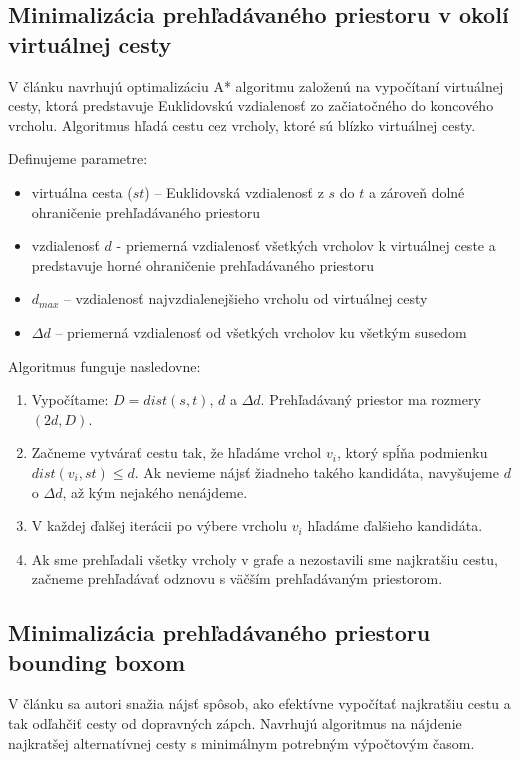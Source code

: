 \subsection{Minimalizácia prehľadávaného priestoru v okolí virtuálnej cesty}

V článku \cite{timedependent} navrhujú optimalizáciu A* algoritmu založenú na vypočítaní virtuálnej cesty, ktorá predstavuje Euklidovskú vzdialenosť zo začiatočného do koncového vrcholu. Algoritmus hľadá cestu cez vrcholy, ktoré sú blízko virtuálnej cesty. 

Definujeme parametre:
\begin{itemize}
\item{virtuálna cesta ($st$) – Euklidovská vzdialenosť z $s$ do $t$} a zároveň dolné ohraničenie prehľadávaného priestoru
\item{vzdialenosť $d$ - priemerná vzdialenosť všetkých vrcholov k virtuálnej ceste a predstavuje horné ohraničenie prehľadávaného priestoru}
\item{$d_{max}$ – vzdialenosť najvzdialenejšieho vrcholu od virtuálnej cesty}
\item{$\Delta d$ – priemerná vzdialenosť od všetkých vrcholov ku všetkým susedom}
\end{itemize}

Algoritmus funguje nasledovne:
\begin{enumerate}
\item Vypočítame: $D = dist(s,t)$, $d$ a $\Delta d$. Prehľadávaný priestor ma rozmery $(2d,D)$.
\item Začneme vytvárať cestu tak, že hľadáme vrchol $v_i$, ktorý spĺňa podmienku \\$dist(v_i, st) \leq d$. Ak nevieme nájsť žiadneho takého kandidáta, navyšujeme $d$ o $\Delta d$, až kým nejakého nenájdeme.
\item V každej ďalšej iterácii po výbere vrcholu $v_i$ hľadáme ďalšieho kandidáta.
\item Ak sme prehľadali všetky vrcholy v grafe a nezostavili sme najkratšiu cestu, začneme prehľadávať odznovu s väčším prehľadávaným priestorom.
\end{enumerate}

\subsection{Minimalizácia prehľadávaného priestoru bounding boxom}
V článku \cite{alternate} sa autori snažia nájsť spôsob, ako efektívne vypočítať najkratšiu cestu a tak odľahčiť cesty od dopravných zápch. Navrhujú algoritmus na nájdenie najkratšej alternatívnej cesty s minimálnym potrebným výpočtovým časom. 

